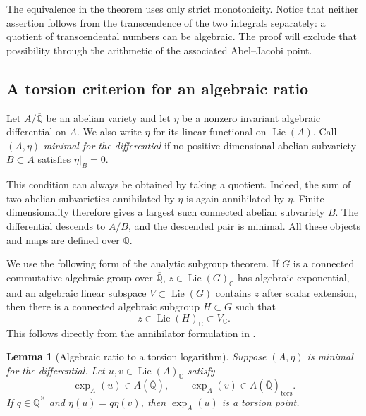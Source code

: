 \documentclass[11pt,a4paper]{article}
\newtheorem{lemma}[theorem]{Lemma}
\theoremstyle{definition}
\theoremstyle{remark}
\numberwithin{equation}{section}
\newcommand{\Qbar}{\overline{\mathbb Q}}
\begin{document}
The equivalence in the theorem uses only strict monotonicity.  Notice
that neither assertion follows from the transcendence of the two
integrals separately: a quotient of transcendental numbers can be
algebraic.  The proof will exclude that possibility through the
arithmetic of the associated Abel--Jacobi point.

\subsection{A torsion criterion for an algebraic ratio}
\label{tr-subsec-criterion}

Let $A/\Qbar$ be an abelian variety and let $\eta$ be a nonzero invariant
algebraic differential on $A$.  We also write $\eta$ for its linear
functional on $\operatorname{Lie}(A)$.  Call $(A,\eta)$
\emph{minimal for the differential} if no positive-dimensional abelian
subvariety $B\subset A$ satisfies $\eta|_B=0$.

This condition can always be obtained by taking a quotient.  Indeed,
the sum of two abelian subvarieties annihilated by $\eta$ is again
annihilated by $\eta$.  Finite-dimensionality therefore gives a largest
such connected abelian subvariety $B$.  The differential descends to
$A/B$, and the descended pair is minimal.  All these objects and maps
are defined over $\Qbar$.

We use the following form of the analytic subgroup theorem.  If $G$
is a connected commutative algebraic group over $\Qbar$, $z\in
\operatorname{Lie}(G)_{\mathbb C}$ has algebraic exponential, and an
algebraic linear subspace $V\subset\operatorname{Lie}(G)$ contains $z$
after scalar extension, then there is a connected algebraic subgroup
$H\subset G$ such that
\[
 z\in\operatorname{Lie}(H)_{\mathbb C}
 \subset V_{\mathbb C}.
\]
This follows directly from the annihilator formulation in
\cite[Theorem~6.2]{lm-HuberWustholz}.

\begin{lemma}[Algebraic ratio to a torsion logarithm]\label{tr-torsion-lemma}
Suppose $(A,\eta)$ is minimal for the differential.  Let
$u,v\in\operatorname{Lie}(A)_{\mathbb C}$ satisfy
\[
 \exp_A(u)\in A(\Qbar),\qquad
 \exp_A(v)\in A(\Qbar)_{\mathrm{tors}}.
\]
If $q\in\Qbar^{\times}$ and $\eta(u)=q\eta(v)$, then
$\exp_A(u)$ is a torsion point.
\end{lemma}
\end{document}
